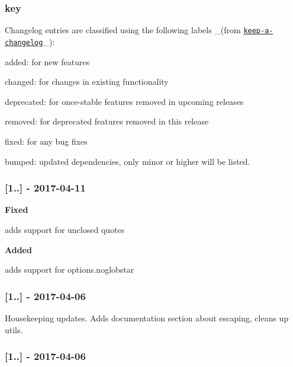 \subsubsection*{key}

Changelog entries are classified using the following labels \+\_\+(from \href{https://github.com/olivierlacan/keep-a-changelog}{\tt keep-\/a-\/changelog}\+\_\+)\+:


\begin{DoxyItemize}
\item {\ttfamily added}\+: for new features
\item {\ttfamily changed}\+: for changes in existing functionality
\item {\ttfamily deprecated}\+: for once-\/stable features removed in upcoming releases
\item {\ttfamily removed}\+: for deprecated features removed in this release
\item {\ttfamily fixed}\+: for any bug fixes
\item {\ttfamily bumped}\+: updated dependencies, only minor or higher will be listed.
\end{DoxyItemize}

\subsubsection*{\mbox{[}1..\mbox{]} -\/ 2017-\/04-\/11}

{\bfseries Fixed}


\begin{DoxyItemize}
\item adds support for unclosed quotes
\end{DoxyItemize}

{\bfseries Added}


\begin{DoxyItemize}
\item adds support for {\ttfamily options.\+noglobstar}
\end{DoxyItemize}

\subsubsection*{\mbox{[}1..\mbox{]} -\/ 2017-\/04-\/06}

Housekeeping updates. Adds documentation section about escaping, cleans up utils.

\subsubsection*{\mbox{[}1..\mbox{]} -\/ 2017-\/04-\/06}

